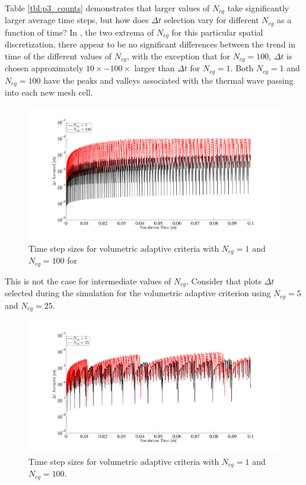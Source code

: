 Table \ref{tbl:p3_counts} demonstrates that larger values of $N_{cg}$ take significantly larger average time steps, but how does $\Delta t$ selection vary for different $N_{cg}$ as a function of time?
In , the two extrema of $N_{cg}$ for this particular spatial discretization, there appear to be no significant differences between the trend in time of the different values of $N_{cg}$, with the exception that for $N_{cg}=100$, $\Delta t$ is chosen approximately $10\times-100\times$ larger than $\Delta t$ for $N_{cg}=1$.  
Both $N_{cg}=1$ and $N_{cg}=100$ have the peaks and valleys associated with the thermal wave passing into each new mesh cell.
\begin{figure}[!htp]
\centering
\includegraphics[width=16cm,trim=2in  0.4in 0.5in 0.75in,clip=true]{chapter6_grey_radtran/Dissertation_Data/Volumetric_Trace_1cg_vs_100cg_vs_time.pdf}
\caption{Time step sizes for volumetric adaptive criteria with $N_{cg}=1$ and $N_{cg}=100$ for }
\label{fig:1c_vs_100c}
\end{figure}
This is not the case for intermediate values of $N_{cg}$.  
Consider  that plots $\Delta t$ selected during the simulation for the volumetric adaptive criterion using $N_{cg}=5$ and $N_{cg}=25$.
\begin{figure}[!htp]
\centering
\includegraphics[width=16cm,trim=2in  0.4in 0.5in 0.75in,clip=true]{chapter6_grey_radtran/Dissertation_Data/Volumetric_Trace_5cg_vs_25cg_vs_time.pdf}
\caption{Time step sizes for volumetric adaptive criteria with $N_{cg}=1$ and $N_{cg}=100$. }
\label{fig:5c_vs_25c}
\end{figure}
